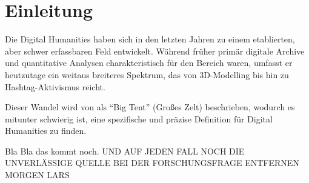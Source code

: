 \section{Einleitung}

Die Digital Humanities haben sich in den letzten Jahren zu einem etablierten, aber schwer erfassbaren Feld entwickelt.
Während früher primär digitale Archive und quantitative Analysen charakteristisch für den Bereich waren, umfasst er heutzutage ein weitaus breiteres Spektrum, das von 3D-Modelling bis hin zu Hashtag-Aktivismus reicht. \parencite{KleinGold2016}

Dieser Wandel wird von \textcite{KleinGold2016} als \enquote{Big Tent} (Großes Zelt) beschrieben, wodurch es mitunter schwierig ist, eine spezifische und präzise Definition für Digital Humanities zu finden.

Bla Bla das kommt noch. UND AUF JEDEN FALL NOCH DIE UNVERLÄSSIGE QUELLE BEI DER FORSCHUNGSFRAGE ENTFERNEN MORGEN LARS
